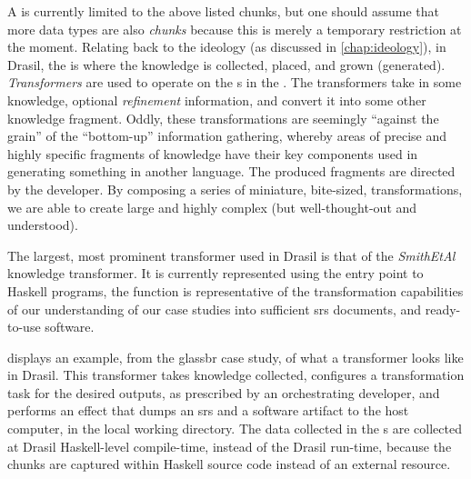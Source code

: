 
A \ChunkDB{} is currently limited to the above listed chunks, but one should assume that more data types are also
\textit{chunks} because this is merely a temporary restriction at the moment.
Relating back to the ideology (as discussed in \autoref{chap:ideology}), in
Drasil, the \ChunkDB{} is where the knowledge is collected, placed, and grown
(generated). \textit{Transformers} are used to operate on the \Chunk{}s in the
\ChunkDB{}. The transformers take in some knowledge, optional
\textit{refinement} information, and convert it into some other knowledge
fragment. Oddly, these transformations are
seemingly ``against the grain'' of the ``bottom-up'' information gathering,
whereby areas of precise and highly specific fragments of knowledge have their
key components used in generating something in another language. The produced
fragments are directed by the developer. By composing a series of miniature,
bite-sized, transformations, we are able to create large and highly complex (but
well-thought-out and understood).

The largest, most prominent transformer used in Drasil is that of the
\textit{SmithEtAl} knowledge transformer. It is currently represented using the entry point to Haskell
programs, the  function is representative of the
transformation capabilities of our understanding of our case studies into
sufficient \acs{srs} documents, and ready-to-use software.


 displays an example, from the
\acs{glassbr} case study, of what a transformer looks like in Drasil. This
transformer takes knowledge collected, configures a transformation task for the
desired outputs, as prescribed by an orchestrating developer, and performs an
 effect that dumps an \acs{srs} and a software artifact to the
host computer, in the local working directory. The data collected in the
\ChunkDB{}s are collected at Drasil Haskell-level compile-time, instead of the
Drasil run-time, because the chunks are captured within Haskell source code
instead of an external resource.


